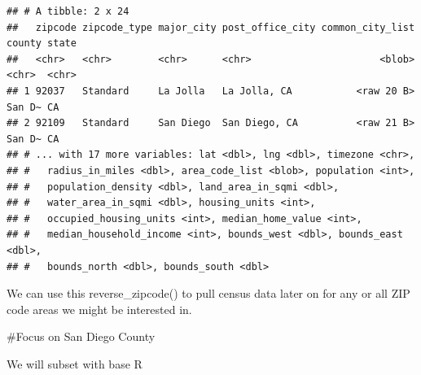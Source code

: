\documentclass[
]{article}
\newenvironment{Shaded}{\begin{snugshade}}{\end{snugshade}}
\newcommand{\CommentTok}[1]{\textcolor[rgb]{0.56,0.35,0.01}{\textit{#1}}}
\newcommand{\FunctionTok}[1]{\textcolor[rgb]{0.00,0.00,0.00}{#1}}
\newcommand{\NormalTok}[1]{#1}
\newcommand{\OtherTok}[1]{\textcolor[rgb]{0.56,0.35,0.01}{#1}}
\newcommand{\SpecialCharTok}[1]{\textcolor[rgb]{0.00,0.00,0.00}{#1}}
\newcommand{\StringTok}[1]{\textcolor[rgb]{0.31,0.60,0.02}{#1}}
\begin{document}
\begin{verbatim}
## # A tibble: 2 x 24
##   zipcode zipcode_type major_city post_office_city common_city_list county state
##   <chr>   <chr>        <chr>      <chr>                      <blob> <chr>  <chr>
## 1 92037   Standard     La Jolla   La Jolla, CA           <raw 20 B> San D~ CA   
## 2 92109   Standard     San Diego  San Diego, CA          <raw 21 B> San D~ CA   
## # ... with 17 more variables: lat <dbl>, lng <dbl>, timezone <chr>,
## #   radius_in_miles <dbl>, area_code_list <blob>, population <int>,
## #   population_density <dbl>, land_area_in_sqmi <dbl>,
## #   water_area_in_sqmi <dbl>, housing_units <int>,
## #   occupied_housing_units <int>, median_home_value <int>,
## #   median_household_income <int>, bounds_west <dbl>, bounds_east <dbl>,
## #   bounds_north <dbl>, bounds_south <dbl>
\end{verbatim}

We can use this reverse\_zipcode() to pull census data later on for any
or all ZIP code areas we might be interested in.

\begin{Shaded}
\end{Shaded}

\#Focus on San Diego County

We will subset with base R

\begin{Shaded}
\end{Shaded}
\end{document}

